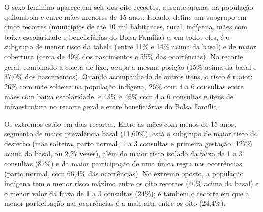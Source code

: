  
O sexo feminino aparece em seis dos oito recortes, ausente apenas na população quilombola e entre mães menores de 15 anos. Isolado, define um subgrupo em cinco recortes (municípios de até 10 mil habitantes, rural, indígena, mães com baixa escolaridade e beneficiárias do Bolsa Família) e, em todos eles, é o subgrupo de menor risco da tabela (entre 11\% e 14\% acima da basal) e de maior cobertura (cerca de 49\% dos nascimentos e 55\% das ocorrências). No recorte geral, combinado à coleta de lixo, ocupa a mesma posição (15\% acima da basal e 37,0\% dos nascimentos). Quando acompanhado de outros itens, o risco é maior: 26\% com mãe solteira na população indígena, 26\% com 4 a 6 consultas entre mães com baixa escolaridade, e 43\% e 46\% com 4 a 6 consultas e itens de infraestrutura no recorte geral e entre beneficiárias do Bolsa Família.
 
Os extremos estão em dois recortes. Entre as mães com menos de 15 anos, segmento de maior prevalência basal (11,60\%), está o subgrupo de maior risco do desfecho (mãe solteira, parto normal, 1 a 3 consultas e primeira gestação, 127\% acima da basal, ou 2,27 vezes), além do maior risco isolado da faixa de 1 a 3 consultas (87\%) e da maior participação de uma única regra nas ocorrências (parto normal, com 66,4\% das ocorrências). No extremo oposto, a população indígena tem o menor risco máximo entre os oito recortes (40\% acima da basal) e o menor valor da faixa de 1 a 3 consultas (24\%); é também o recorte em que a menor participação nas ocorrências é a mais alta entre os oito (24,4\%).

\FloatBarrier
